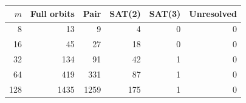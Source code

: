 \begin{tabular}{rrrrrr}\toprule $m$ & Full orbits & Pair & SAT(2) & SAT(3) & Unresolved \\
\midrule
8 & 13 & 9 & 4 & 0 & 0 \\
16 & 45 & 27 & 18 & 0 & 0 \\
32 & 134 & 91 & 42 & 1 & 0 \\
64 & 419 & 331 & 87 & 1 & 0 \\
128 & 1435 & 1259 & 175 & 1 & 0 \\
\bottomrule\end{tabular}
